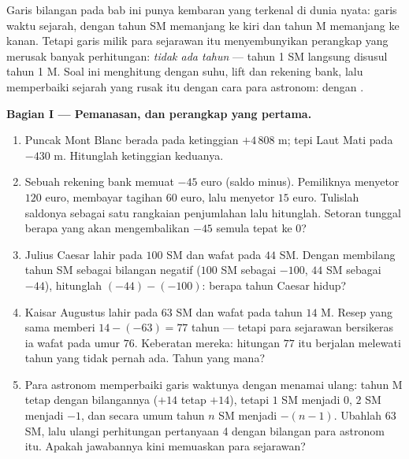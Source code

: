 \begin{problem}
\label{pb:g7:negatives:1}
Garis bilangan pada bab ini punya kembaran yang terkenal di dunia
nyata: garis waktu sejarah, dengan tahun SM memanjang ke kiri dan
tahun M memanjang ke kanan. Tetapi garis milik para sejarawan itu
menyembunyikan perangkap yang merusak banyak perhitungan:
\emph{tidak ada tahun } --- tahun 1 SM langsung disusul tahun 1 M.
Soal ini menghitung dengan suhu, lift dan rekening bank, lalu
memperbaiki  sejarah yang rusak itu dengan cara para astronom:
dengan .

\medskip
\noindent\textbf{Bagian I --- Pemanasan, dan perangkap yang pertama.}
\begin{enumerate}
  \item Puncak Mont Blanc berada pada ketinggian $+4\,808$ m; tepi
        Laut Mati pada $-430$ m. Hitunglah  ketinggian keduanya.
  \item Sebuah rekening bank memuat $-45$ euro (saldo minus).
        Pemiliknya menyetor $120$ euro, membayar tagihan $60$ euro,
        lalu menyetor $15$ euro. Tulislah saldonya sebagai satu
        rangkaian penjumlahan lalu hitunglah. Setoran tunggal berapa
        yang akan mengembalikan $-45$ semula tepat ke $0$?
  \item Julius Caesar lahir pada $100$ SM dan wafat pada $44$ SM.
        Dengan membilang tahun SM sebagai bilangan negatif ($100$ SM
        sebagai $-100$, $44$ SM sebagai $-44$), hitunglah
        $(-44) - (-100)$: berapa tahun Caesar hidup?
  \item Kaisar Augustus lahir pada $63$ SM dan wafat pada tahun $14$
        M. Resep yang sama memberi $14 - (-63) = 77$ tahun --- tetapi
        para sejarawan bersikeras ia wafat pada umur $76$. Keberatan
        mereka: hitungan $77$ itu berjalan melewati tahun yang tidak
        pernah ada. Tahun yang mana?
  \item Para astronom memperbaiki garis waktunya dengan menamai
        ulang: tahun M tetap dengan bilangannya ($+14$ tetap $+14$),
        tetapi $1$ SM menjadi $0$, $2$ SM menjadi $-1$, dan secara
        umum tahun $n$ SM menjadi $-(n - 1)$. Ubahlah $63$ SM, lalu
        ulangi perhitungan pertanyaan 4 dengan bilangan para astronom
        itu. Apakah jawabannya kini memuaskan para sejarawan?
\end{enumerate}


\end{problem}
